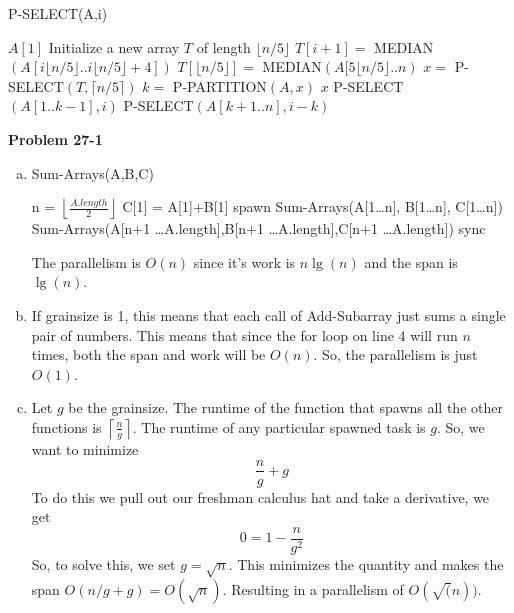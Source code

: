 \documentclass{article}
\begin{document}
\begin{algorithm}
\caption{P-SELECT(A,i)}
\begin{algorithmic}[1]
	\State \Return $A[1]$
\EndIf
\State Initialize a new array $T$ of length $\lfloor n/5 \rfloor$
	\State $T[i+1] = $ MEDIAN$(A[i\lfloor n/5 \rfloor..i\lfloor n/5 \rfloor + 4])$
\EndParFor
{}
	\State $T[\lfloor n/5 \rfloor] =$  MEDIAN$(A[5\lfloor n/5 \rfloor..n)$
\EndIf
\State $x = $ P-SELECT$(T, \lceil n/5 \rceil)$
\State $k = $ P-PARTITION$(A,x)$
	\State \Return $x$
	\State P-SELECT$(A[1..k-1],i)$
\Else
	\State P-SELECT$(A[k+1..n],i-k)$
\EndIf
\end{algorithmic}
\end{algorithm}

\noindent\textbf{Problem 27-1}\\

\begin{enumerate}[a.]
\item
\begin{algorithm}
\caption{Sum-Arrays(A,B,C)}
\begin{algorithmic}
\State n = $\left\lfloor \frac{A.length}{2} \right\rfloor$
\State C[1] = A[1]+B[1]
\Else
\State spawn Sum-Arrays(A[1\ldots n], B[1\ldots n], C[1\ldots n])
\State Sum-Arrays(A[n+1 \ldots A.length],B[n+1 \ldots A.length],C[n+1 \ldots A.length])
\State sync
\EndIf
\end{algorithmic}
\end{algorithm}
The parallelism is $O(n)$ since it's work is $n\lg(n)$ and the span is $\lg(n)$. 
\item
If grainsize is 1, this means that each call of Add-Subarray just sums a single pair of numbers. This means that since the for loop on line 4 will run $n$ times, both the span and work will be $O(n)$. So, the parallelism is just $O(1)$.
\item
Let $g$ be the grainsize. The runtime of the function that spawns all the other functions is $\left\lceil \frac{n}{g} \right\rceil$. The runtime of any particular spawned task is $g$. So, we want to minimize 
\[
\frac{n}{g}+g
\]
To do this we pull out our freshman calculus hat and take a derivative, we get
\[
0 = 1 - \frac{n}{g^2}
\]
So, to solve this, we set $g = \sqrt{n}$. This minimizes the quantity and makes the span $O(n/g +g) = O(\sqrt{n})$. Resulting in a parallelism of $O(\sqrt(n))$.
\end{enumerate}
\end{document}
